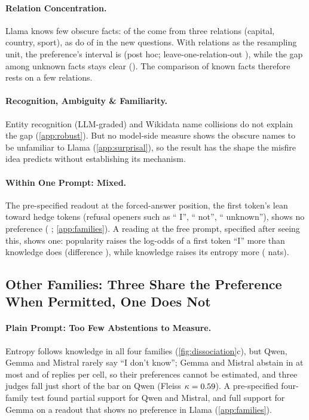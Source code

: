 \documentclass{article}
\newcommand{\idk}{``I don't know''}
\begin{document}
\paragraph{Relation Concentration.} Llama knows few obscure facts: \rcTopThree{} of the \gsObsKnownTotal{} come from three relations (capital, country, sport), as do \nqTopThree{} of \nqObsKnownN{} in the new questions. With relations as the resampling unit, the preference's interval is \rcClusCI{} (post hoc; leave-one-relation-out \rcLoro), while the gap among unknown facts stays clear (\rcUnkClusCI). The comparison of known facts therefore rests on a few relations.

\paragraph{Recognition, Ambiguity \& Familiarity.} Entity recognition (LLM-graded) and Wikidata name collisions do not explain the gap (\cref{app:robust}). But no model-side measure shows the obscure names to be unfamiliar to Llama (\cref{app:surprisal}), so the result has the shape the misfire idea predicts without establishing its mechanism.

\paragraph{Within One Prompt: Mixed.} The pre-specified readout at the forced-answer position, the first token's lean toward hedge tokens (refusal openers such as `` I'', `` not'', `` unknown''), shows no preference (\loLlamaDiff{} \loLlamaDiffCI; \cref{app:families}). A reading at the free prompt, specified after seeing this, shows one: popularity raises the log-odds of a first token ``I'' more than knowledge does (difference \eoFreeIDiff{} \eoFreeIDiffCI), while knowledge raises its entropy more (\eoFreeEntDiff{} \eoFreeEntDiffCI{} nats).

\subsection{Other Families: Three Share the Preference When Permitted, One Does Not}
\label{sec:families}

\paragraph{Plain Prompt: Too Few Abstentions to Measure.} Entropy follows knowledge in all four families (\cref{fig:dissociation}c), but Qwen, Gemma and Mistral rarely say \idk; Gemma and Mistral abstain in at most \tjGemmaObsUnk{} and \tjMistralObsUnk{} of replies per cell, so their preferences cannot be estimated, and three judges fall just short of the bar on Qwen (Fleiss $\kappa=0.59$). A pre-specified four-family test found partial support for Qwen and Mistral, and full support for Gemma on a readout that shows no preference in Llama (\cref{app:families}).
\end{document}
